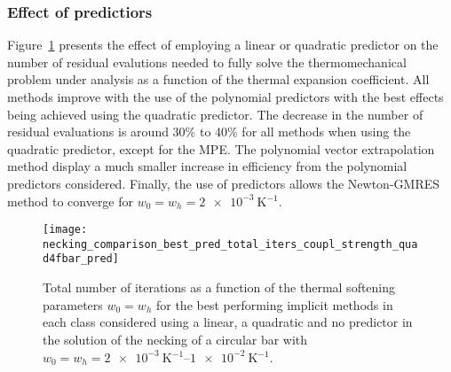 \subsubsection{Effect of predictiors}

Figure~\ref{fig:necking_comparison_best_pred_total_iters_coupl_strength_quad4fbar_pred} presents the effect of employing a linear or quadratic predictor on the number of residual evalutions needed to fully solve the thermomechanical problem under analysis as a function of the thermal expansion coefficient.
All methods improve with the use of the polynomial predictors with the best effects being achieved using the quadratic predictor.
The decrease in the number of residual evaluations is around 30\% to 40\% for all methods when using the quadratic predictor, except for the MPE.
The polynomial vector extrapolation method display a much smaller increase in efficiency from the polynomial predictors considered.
Finally, the use of predictors allows the Newton-GMRES method to converge for \(w_0=w_h=\SI{2e-3}{\kelvin^{-1}}\).

\begin{figure}[hbtp]
  \texttt{[image: necking\_comparison\_best\_pred\_total\_iters\_coupl\_strength\_quad4fbar\_pred]}
  \caption{Total number of iterations as a function of the thermal softening parameters \(w_0=w_h\) for the  best performing implicit methods in each class considered using a linear, a quadratic and no predictor in the solution of the necking of a circular bar with \(w_0=w_h=\SIrange{2e-3}{1e-2}{\kelvin^{-1}}\).}
\label{fig:necking_comparison_best_pred_total_iters_coupl_strength_quad4fbar_pred}
\end{figure}

\FloatBarrier
